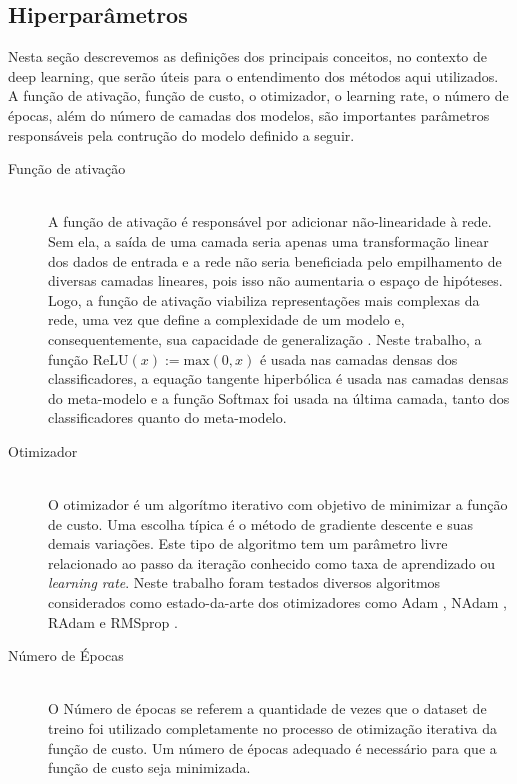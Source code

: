 \subsection{Hiperparâmetros}
\label{sec:modelo-hp}

Nesta seção descrevemos as definições dos principais conceitos, no contexto de deep learning, que serão úteis para o entendimento dos métodos aqui utilizados. A função de ativação, função de custo, o otimizador, o learning rate, o número de épocas, além do número de camadas dos modelos, são importantes parâmetros responsáveis pela contrução do modelo definido a seguir.

\begin{description}
  \item[Função de ativação] \hfill \\
        A função de ativação é responsável por adicionar não-linearidade à rede. Sem ela, a saída de uma camada seria apenas uma transformação linear dos dados de entrada e a rede não seria beneficiada pelo empilhamento de diversas camadas lineares, pois isso não aumentaria o espaço de hipóteses. Logo, a função de ativação viabiliza representações mais complexas da rede, uma vez que define a complexidade de um modelo e, consequentemente, sua capacidade de generalização \cite{CholletBook}. Neste trabalho, a função $\textrm{ReLU}(x) := \textrm{max}(0, x)$ é usada nas camadas densas dos classificadores, a equação tangente hiperbólica é usada nas camadas densas do meta-modelo e a função Softmax \cite{Bridle1990} foi usada na última camada, tanto dos classificadores quanto do meta-modelo.

  \item[Otimizador] \hfill \\
        O otimizador é um algorítmo iterativo com objetivo de minimizar a função de custo. Uma escolha típica é o método de gradiente descente e suas demais variações. Este tipo de algoritmo tem um parâmetro livre relacionado ao passo da iteração conhecido como taxa de aprendizado ou \textit{learning rate}. Neste trabalho foram testados diversos algoritmos considerados como estado-da-arte dos otimizadores como Adam \cite{Adam}, NAdam \cite{NAdam}, RAdam \cite{RAdam} e RMSprop \cite{RMSprop}.

  \item[Número de Épocas] \hfill \\
        O Número de épocas se referem a quantidade de vezes que o dataset de treino foi utilizado completamente no processo de otimização iterativa da função de custo. Um número de épocas adequado é necessário para que a função de custo seja minimizada.


\end{description}
